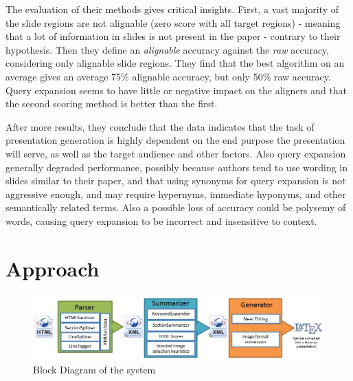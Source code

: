 \documentclass[10pt,twocolumn,letterpaper]{article}
\begin{document}
The evaluation of their methods gives critical insights. First, a vast majority of the slide regions are
not alignable (zero score with all target regions) - meaning that a lot of information in slides is not
present in the paper - contrary to their hypothesis. Then they define an \textit{alignable} accuracy against
the \textit{raw} accuracy, considering only alignable slide regions. They find that the best algorithm
on an average gives an average 75\% alignable accuracy, but only 50\% raw accuracy. Query expansion seems
to have little or negative impact on the aligners and that the second scoring method is better than
the first.

After more results, they conclude that the data indicates that the task of presentation generation
is highly dependent on the end purpose the presentation will serve, as well as the target audience and other
factors. Also query expansion generally degraded performance, possibly because authors tend to use wording in
slides similar to their paper, and that using synonyms for query expansion is not aggressive enough, and may
require hypernyms, immediate hyponyms, and other semantically related terms. Also a possible loss of accuracy
could be polysemy of words, causing query expansion to be incorrect and insensitive to context.



\section{Approach}


\begin{figure}
\begin{center}
\includegraphics[width=\linewidth]{system.jpg}
\end{center}
   \caption{Block Diagram of the system}
\label{fig:short}
\end{figure}
\end{document}
